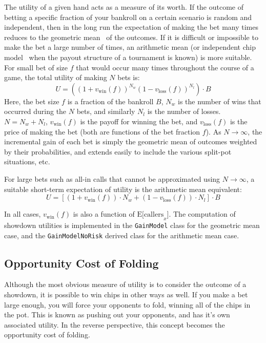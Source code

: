 The utility of a given hand acts as a measure of its worth.
If the outcome of betting a specific fraction of your bankroll on a certain scenario is random and independent, then in the long run the expectation of making the bet many times reduces to the geometric mean~\cite{KellyCriterion} of the outcomes.
If it is difficult or impossible to make the bet a large number of times, an arithmetic mean (or independent chip model~\cite{ICMmag2007} when the payout structure of a tournament is known) is more suitable.
For small bet of size $f$ that would occur many times throughout the course of a game, the total utility of making $N$ bets is:
\[
U = \left( \left( 1 + v_{\mathrm{win}} \left( f \right) \right)^{N_w} \left( 1 - v_{\mathrm{loss}} \left( f \right) \right)^{N_l} \right) \cdot B
\]
Here, the bet size $f$ is a fraction of the bankroll $B$, $N_w$ is the number of wins that occurred during the $N$ bets, and similarly $N_l$ is the number of losses.
$N = N_w + N_l$, $v_{\mathrm{win}} \left( f \right)$ is the payoff for winning the bet, and $v_{\mathrm{loss}} \left( f \right)$ is the price of making the bet (both are functions of the bet fraction $f$).
As $N \to \infty$, the incremental gain of each bet is simply the geometric mean of outcomes weighted by their probabilities, and extends easily to include the various split-pot situations, etc.

For large bets such as all-in calls that cannot be approximated using $N \to \infty$, a suitable short-term expectation of utility is the arithmetic mean equivalent:
\[
U = \left[ \left( 1 + v_{\mathrm{win}} \left( f \right) \right) \cdot N_w + \left( 1 - v_{\mathrm{loss}} \left( f \right) \right) \cdot N_l \right] \cdot B
\]

In all cases, $v_{\mathrm{win}} \left( f \right)$ is also a function of $\mathrm{E[callers}_x]$.
The computation of showdown utilities is implemented in the \texttt{GainModel} class for the geometric mean case, and the \texttt{GainModelNoRisk} derived class for the arithmetic mean case.



\subsection{Opportunity Cost of Folding}
\label{sec:FoldEquity}
Although the most obvious measure of utility is to consider the outcome of a showdown, it is possible to win chips in other ways as well.
If you make a bet large enough, you will force your opponents to fold, winning all of the chips in the pot.
This is known as pushing out your opponents, and has it's own associated utility.
In the reverse perspective, this concept becomes the opportunity cost of folding.

